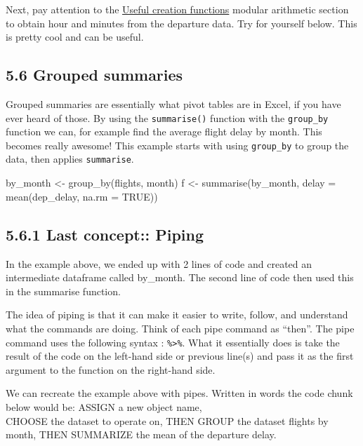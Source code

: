 \documentclass[
]{article}
\newenvironment{Shaded}{\begin{snugshade}}{\end{snugshade}}
\newcommand{\AttributeTok}[1]{\textcolor[rgb]{0.77,0.63,0.00}{#1}}
\newcommand{\ConstantTok}[1]{\textcolor[rgb]{0.00,0.00,0.00}{#1}}
\newcommand{\FunctionTok}[1]{\textcolor[rgb]{0.00,0.00,0.00}{#1}}
\newcommand{\NormalTok}[1]{#1}
\newcommand{\OtherTok}[1]{\textcolor[rgb]{0.56,0.35,0.01}{#1}}
\begin{document}
Next, pay attention to the
\href{https://r4ds.had.co.nz/transform.html\#mutate-funs}{Useful
creation functions} modular arithmetic section to obtain hour and
minutes from the departure data. Try for yourself below. This is pretty
cool and can be useful.

\hypertarget{grouped-summaries}{%
\subsection{5.6 Grouped summaries}\label{grouped-summaries}}

Grouped summaries are essentially what pivot tables are in Excel, if you
have ever heard of those. By using the \texttt{summarise()} function
with the \texttt{group\_by} function we can, for example find the
average flight delay by month. This becomes really awesome! This example
starts with using \texttt{group\_by} to group the data, then applies
\texttt{summarise}.

\begin{Shaded}
\begin{Highlighting}[]
\NormalTok{by\_month }\OtherTok{\textless{}{-}} \FunctionTok{group\_by}\NormalTok{(flights, month)}
\NormalTok{f }\OtherTok{\textless{}{-}} \FunctionTok{summarise}\NormalTok{(by\_month, }\AttributeTok{delay =} \FunctionTok{mean}\NormalTok{(dep\_delay, }\AttributeTok{na.rm =} \ConstantTok{TRUE}\NormalTok{))}
\end{Highlighting}
\end{Shaded}

\hypertarget{last-concept-piping}{%
\subsection{5.6.1 Last concept:: Piping}\label{last-concept-piping}}

In the example above, we ended up with 2 lines of code and created an
intermediate dataframe called by\_month. The second line of code then
used this in the summarise function.

The idea of piping is that it can make it easier to write, follow, and
understand what the commands are doing. Think of each pipe command as
``then''. The pipe command uses the following syntax :
\texttt{\%\textgreater{}\%}. What it essentially does is take the result
of the code on the left-hand side or previous line(s) and pass it as the
first argument to the function on the right-hand side.

We can recreate the example above with pipes. Written in words the code
chunk below would be: ASSIGN a new object name,\\
CHOOSE the dataset to operate on, THEN GROUP the dataset flights by
month, THEN SUMMARIZE the mean of the departure delay.
\end{document}
